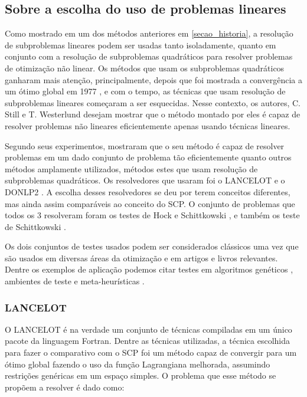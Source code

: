 \subsection{Sobre a escolha do uso de problemas lineares}

\noindent
Como mostrado em um dos métodos anteriores em \ref{secao_historia}, a resolução de subproblemas
lineares podem ser usadas tanto isoladamente, quanto em conjunto com a resolução de subproblemas
quadráticos para resolver problemas de otimização não linear. Os métodos que usam os subproblemas
quadráticos ganharam mais atenção, principalmente, depois que foi mostrada a convergência a um
ótimo global em 1977 \cite{han1977globally}, e com o tempo, as técnicas que usam resolução de
subproblemas lineares começaram a ser esquecidas. Nesse contexto, os autores, C. Still e
T. Westerlund desejam mostrar que o método montado por eles é capaz de resolver problemas não
lineares eficientemente apenas usando técnicas lineares.

Segundo seus experimentos, mostraram que o seu método é capaz de resolver problemas em um dado
conjunto de problema tão eficientemente quanto outros métodos amplamente utilizados, métodos
estes que usam resolução de subproblemas quadráticos. Os resolvedores que usaram foi o LANCELOT
\cite{conn1991globally} e o DONLP2 \cite{spellucci1999donlp2}. A escolha desses resolvedores se
deu por terem conceitos diferentes, mas ainda assim comparáveis ao conceito do SCP. O conjunto
de problemas que todos os 3 resolveram foram os testes de Hock e Schittkowski \cite{Hock1981}, e
também os teste de Schittkowski \cite{Schittkowski1987}.

Os dois conjuntos de testes usados podem ser considerados clássicos uma vez que são usados em
diversas áreas da otimização e em artigos e livros relevantes. Dentre os exemplos de aplicação
podemos citar testes em algoritmos genéticos \cite{Deb_2000, Joines}, ambientes de teste
\cite{Bongartz_1995} e meta-heurísticas \cite{Gandomi_2012}.

\subsubsection{LANCELOT}
\label{sec_lancelot}

\noindent
O LANCELOT \cite{conn1991globally} é na verdade um conjunto de técnicas compiladas em um único
pacote da  linguagem Fortran. Dentre as técnicas utilizadas, a técnica escolhida para fazer o
comparativo com o SCP foi um método capaz de convergir para um ótimo global fazendo o uso da
função Lagrangiana melhorada, assumindo restrições genéricas em um espaço simples. O problema
que esse método se propõem a resolver é dado como:



